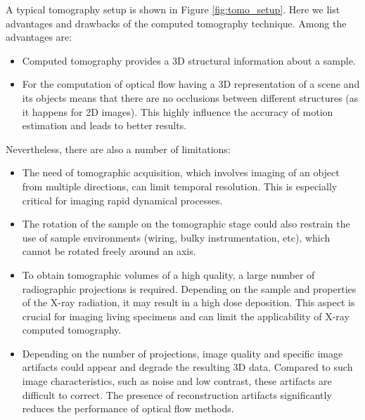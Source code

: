 A typical tomography setup is shown in Figure \ref{fig:tomo_setup}. Here we list advantages and drawbacks of the computed tomography technique.  Among the advantages are:
 \begin{itemize}
  \item   Computed tomography provides a 3D structural information about a sample. 
  \item   For the computation of optical flow having a 3D representation of a  scene and its objects means that there are no occlusions between different structures (as it happens for 2D images). This highly influence the accuracy of motion estimation and leads to better results.
\end{itemize}
Nevertheless, there are also a number of limitations:
 \begin{itemize}
  \item   The need of tomographic acquisition, which involves imaging of an object from multiple directions, can limit temporal resolution. This is especially critical for imaging rapid dynamical processes. 
  \item   The rotation of the sample on the tomographic stage could also restrain the use of sample environments (wiring, bulky instrumentation, etc), which cannot be rotated freely around an axis. 
  \item   To obtain tomographic volumes of a high quality, a large number of radiographic projections is required. Depending on the sample and properties of the X-ray radiation, it may result in a high dose deposition. This aspect is crucial for imaging living specimens and can limit the applicability of X-ray computed tomography.   
  \item Depending on the number of projections, image quality and specific image artifacts could appear and degrade the resulting 3D data. Compared to such image characteristics, such as noise and low contrast, these artifacts are difficult to correct. The presence of reconstruction artifacts significantly reduces the performance of optical flow methods. 
\end{itemize}



%



